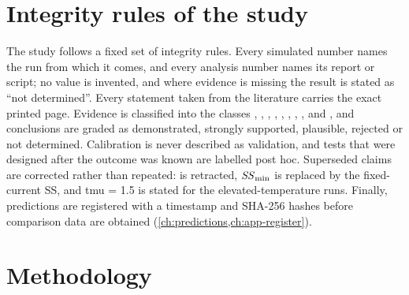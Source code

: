 \section{Integrity rules of the study}\label{sec:intro-integrity}

The study follows a fixed set of integrity rules. Every simulated number names the run from which it comes, and every analysis number names its report or script; no value is invented, and where evidence is missing the result is stated as ``not determined''. Every statement taken from the literature carries the exact printed page. Evidence is classified into the classes \evDATA, \evNUM, \evCAL, \evOOS, \evPOST, \evPRED, \evSURR, \evTHEORY, \evLIT{} and \evCORR, and conclusions are graded as demonstrated, strongly supported, plausible, rejected or not determined. Calibration is never described as validation, and tests that were designed after the outcome was known are labelled post hoc. Superseded claims are corrected rather than repeated:  is retracted, $\mathit{SS}_{\min}$ is replaced by the fixed-current SS, and tmu = 1.5 is stated for the elevated-temperature runs. Finally, predictions are registered with a timestamp and SHA-256 hashes before comparison data are obtained (\cref{ch:predictions,ch:app-register}).

\section{Methodology}\label{sec:intro-method}


